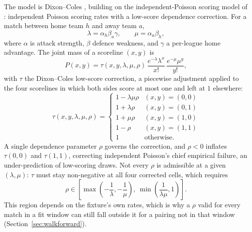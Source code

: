 \documentclass[11pt,a4paper]{article}
\begin{document}
The model is Dixon--Coles \citep{dixon1997}, building on the independent-Poisson
scoring model of \citet{maher1982}: independent Poisson scoring rates with a
low-score dependence correction. For a match between home team $h$ and away
team $a$,
\begin{equation}
  \lambda = \alpha_h \beta_a \gamma, \qquad \mu = \alpha_a \beta_h,
\end{equation}
where $\alpha$ is attack strength, $\beta$ defence weakness, and $\gamma$ a
per-league home advantage. The joint mass of a scoreline $(x, y)$ is
\begin{equation}
  P(x, y) = \tau(x, y, \lambda, \mu, \rho)\,
            \frac{e^{-\lambda}\lambda^x}{x!}\,
            \frac{e^{-\mu}\mu^y}{y!},
  \label{eq:dc-joint}
\end{equation}
with $\tau$ the Dixon--Coles low-score correction, a piecewise adjustment
applied to the four scorelines in which both sides score at most one and left
at $1$ elsewhere:
\begin{equation}
  \tau(x,y,\lambda,\mu,\rho) =
  \begin{cases}
    1 - \lambda\mu\rho & (x,y) = (0,0) \\
    1 + \lambda\rho     & (x,y) = (0,1) \\
    1 + \mu\rho         & (x,y) = (1,0) \\
    1 - \rho            & (x,y) = (1,1) \\
    1                   & \text{otherwise.}
  \end{cases}
  \label{eq:tau}
\end{equation}
A single dependence parameter $\rho$ governs the correction, and $\rho < 0$
inflates $\tau(0,0)$ and $\tau(1,1)$, correcting independent Poisson's chief
empirical failure, an under-prediction of low-scoring draws. Not every $\rho$
is admissible at a given $(\lambda,\mu)$: $\tau$ must stay non-negative at all
four corrected cells, which requires
\begin{equation}
  \rho \in \left[\max\left(-\frac{1}{\lambda}, -\frac{1}{\mu}\right),\
                  \min\left(\frac{1}{\lambda\mu}, 1\right)\right].
  \label{eq:rho-bounds}
\end{equation}
This region depends on the fixture's own rates, which is why a $\rho$ valid
for every match in a fit window can still fall outside it for a pairing not
in that window (Section~\ref{sec:walkforward}).
\end{document}
